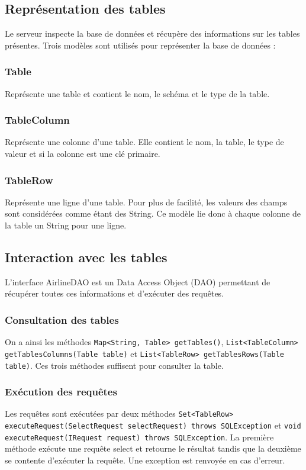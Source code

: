 \subsection{Représentation des tables}
Le serveur inspecte la base de données et récupère des informations sur les tables présentes. Trois modèles sont utilisés pour représenter la base de données :
\subsubsection{Table}
Représente une table et contient le nom, le schéma et le type de la table.
\subsubsection{TableColumn}
Représente une colonne d'une table. Elle contient le nom, la table, le type de valeur et si la colonne est une clé primaire.
\subsubsection{TableRow}
Représente une ligne d'une table. Pour plus de facilité, les valeurs des champs sont considérées comme étant des String. Ce modèle lie donc à chaque colonne de la table un String pour une ligne.
\subsection{Interaction avec les tables}
L'interface AirlineDAO est un Data Access Object (DAO) permettant de récupérer toutes ces informations et d'exécuter des requêtes. 
\subsubsection{Consultation des tables}
On a ainsi les méthodes \texttt{Map<String, Table> getTables()}, \texttt{List<TableColumn> getTablesColumns(Table table)} et \texttt{List<TableRow> getTablesRows(Table table)}. Ces trois méthodes suffisent pour consulter la table.
\subsubsection{Exécution des requêtes}
Les requêtes sont exécutées par deux méthodes \texttt{Set<TableRow> executeRequest(SelectRequest selectRequest) throws SQLException} et \texttt{void executeRequest(IRequest request) throws SQLException}. La première méthode exécute une requête select et retourne le résultat tandis que la deuxième se contente d'exécuter la requête. Une exception est renvoyée en cas d'erreur.

